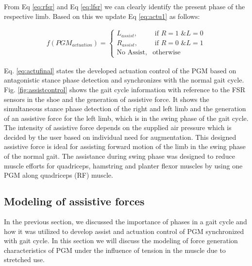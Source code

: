 \documentclass[paper,JRM,paper]{jaciiiarticle}
\begin{document}
From Eq \ref{eq:rfsr} and Eq \ref{eq:lfsr} we can clearly identify the present phase of the respective limb. Based on this we update Eq \ref{eq:actu1} as follows:

\begin{align}\label{eq:actufinal}
f(PGM_{actuation}) = ^{}
\begin{cases}
L_{assist},& \text{ if } R = 1\text{ \& } L = 0\\ 
R_{assist},& \text{ if } R = 0\text{ \& } L = 1\\ 
\text{No Assist}, & \text{otherwise}
\end{cases}
\end{align}

Eq. \ref{eq:actufinal} states the developed actuation control of the PGM based on antagonistic stance phase detection and synchronizes with the normal gait cycle. Fig. \ref{fig:assistcontrol} shows the gait cycle information with reference to the FSR sensors in the shoe and the generation of assistive force. It shows the simultaneous stance phase detection of the right and left limb and the generation of an assistive force for the left limb, which is in the swing phase of the gait cycle. The intensity of assistive force depends on the supplied air pressure which is decided by the user based on individual need for augmentation. This designed assistive force is ideal for assisting forward motion of the limb in the swing phase of the normal gait. The assistance during swing phase was designed to reduce muscle efforts for quadriceps, hamstring and planter flexor muscles by using one PGM along quadriceps (RF) muscle. 


\subsection{Modeling of assistive forces}
In the previous section, we discussed the importance of phases in a gait cycle and how it was utilized to develop assist and actuation control of PGM synchronized with gait cycle. In this section we will discuss the modeling of force generation characteristics of PGM under the influence of tension in the muscle due to stretched use. 
\end{document}
